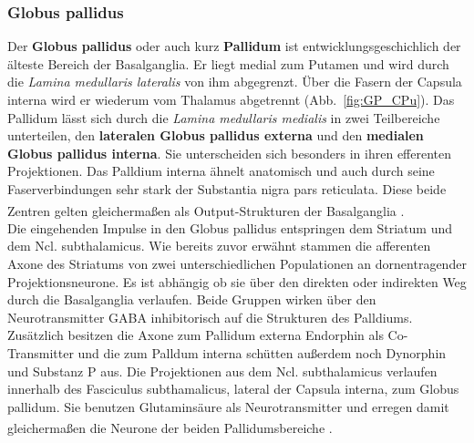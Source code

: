\documentclass[12pt,a4paper,pdftex]{article}
\begin{document}
\subsubsection*{Globus pallidus}  
Der \textbf{Globus pallidus} oder auch kurz \textbf{Pallidum} ist entwicklungsgeschichlich der älteste Bereich der Basalganglia. Er liegt medial zum Putamen und wird durch die \textit{Lamina medullaris lateralis} von ihm abgegrenzt. Über die Fasern der Capsula interna wird er wiederum vom Thalamus abgetrennt (Abb.~\ref{fig:GP_CPu}). Das Pallidum lässt sich durch die \textit{Lamina medullaris medialis} in zwei Teilbereiche unterteilen, den \textbf{lateralen Globus pallidus externa} und den \textbf{medialen Globus pallidus interna}. Sie unterscheiden sich besonders in ihren efferenten Projektionen. Das Palldium interna ähnelt anatomisch und auch durch seine Faserverbindungen sehr stark der Substantia nigra pars reticulata. Diese beide Zentren gelten gleichermaßen als Output-Strukturen der Basalganglia \textsuperscript{\cite[14]{crossman2014neuroanatomy}}.\\ 
Die eingehenden Impulse in den Globus pallidus entspringen dem Striatum und dem Ncl. subthalamicus. Wie bereits zuvor erwähnt stammen die afferenten Axone des Striatums von zwei unterschiedlichen Populationen an dornentragender Projektionsneurone. Es ist abhängig ob sie über den direkten oder indirekten Weg durch die Basalganglia verlaufen. Beide Gruppen wirken über den Neurotransmitter GABA inhibitorisch auf die Strukturen des Palldiums. Zusätzlich besitzen die Axone zum Pallidum externa Endorphin als Co-Transmitter und die zum Palldum interna schütten außerdem noch Dynorphin und Substanz P aus. Die Projektionen aus dem Ncl. subthalamicus verlaufen innerhalb des Fasciculus subthamalicus, lateral der Capsula interna, zum Globus pallidum. Sie benutzen Glutaminsäure als Neurotransmitter und erregen damit gleichermaßen die Neurone der beiden Pallidumsbereiche \textsuperscript{\cite[14]{crossman2014neuroanatomy}}.\\    
\end{document}
